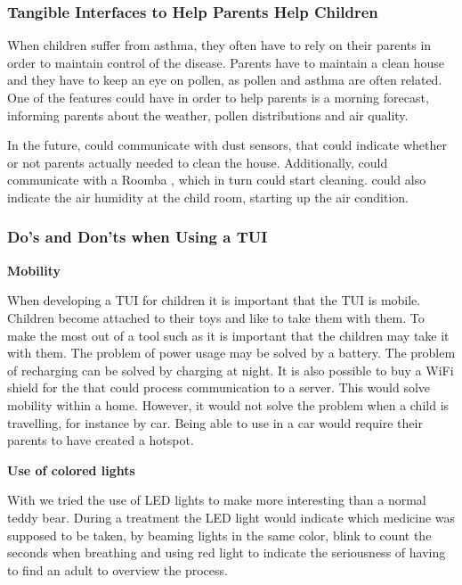 \subsubsection{Tangible Interfaces to Help Parents Help Children}
\label{sec:tuitohelpparentshelpchildren}
When children suffer from asthma, they often have to rely on their parents in order to maintain control of the disease. Parents have to maintain a clean house and they have to keep an eye on pollen, as pollen and asthma are often related. One of the features \buddy{} could have in order to help parents is a morning forecast, informing parents about the weather, pollen distributions and air quality. 

In the future, \buddy{} could communicate with dust sensors, that could indicate whether or not parents actually needed to clean the house. Additionally, \buddy{} could communicate with a Roomba , which in turn could start cleaning. \buddy{} could also indicate the air humidity at the child room, starting up the air condition.   


\subsubsection{Do's and Don'ts when Using a TUI}
\label{sec:dosanddontsfortui}

\textbf{Mobility}

When developing a TUI for children it is important that the TUI is mobile. Children become attached to their toys and like to take them with them. To make the most out of a tool such as \buddy{} it is important that the children may take it with them. The problem of power usage may be solved by a battery. The problem of recharging can be solved by charging at night. It is also possible to buy a WiFi shield for the \rpi{} that could process communication to a server. This would solve mobility within a home. However, it would not solve the problem when a child is travelling, for instance by car. Being able to use \ab{} in a car would require their parents to have created a hotspot.   

\textbf{Use of colored lights}

With \buddy{} we tried the use of LED lights to make \buddy{} more interesting than a normal teddy bear. During a treatment the LED light would indicate which medicine was supposed to be taken, by beaming lights in the same color, blink to count the seconds when breathing and using red light to indicate the seriousness of having to find an adult to overview the process. 

